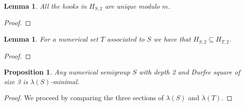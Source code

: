 \documentclass[11pt,letterpaper]{article}
\newtheorem{lem}[thm]{Lemma}
\newtheorem{prop}[thm]{Proposition}
\theoremstyle{definition}
\begin{document}
\begin{lem}
    All the hooks in $H_{S,2}$ are unique modulo $m$.
\end{lem}

\begin{proof}

\end{proof}






\begin{lem}
    For a numerical set $T$ associated to $S$ we have that $H_{S,2}\subseteq H_{T,2}$.
\end{lem}

\begin{proof}
    
\end{proof}








\begin{prop}
    Any numerical semigroup $S$ with depth 2 and Durfee square of size 3 is $\lambda(S)$-minimal.
\end{prop}

\begin{proof}
    We proceed by comparing the three sections of $\lambda(S)$ and $\lambda(T)$. 
\end{proof}
\end{document}
